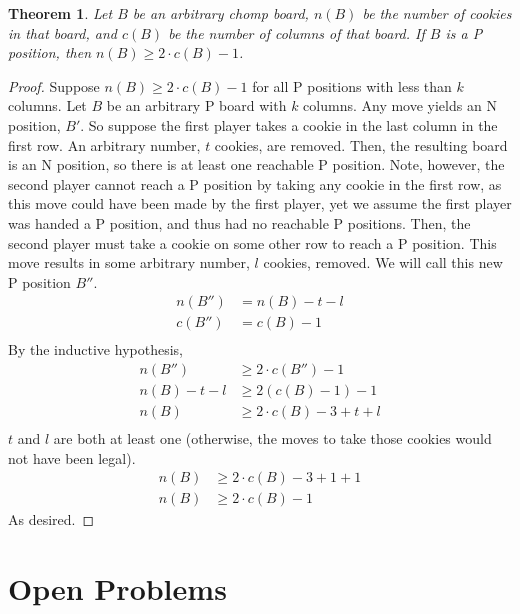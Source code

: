 \documentclass{amsart}
\newtheorem{thm}{Theorem}
\theoremstyle{definition}
\theoremstyle{remark}
\numberwithin{equation}{section}
\begin{document}
\begin{thm}
	Let $B$ be an arbitrary chomp board, $n(B)$ be the number of cookies in that board, and $c(B)$ be the number of columns of that board.  If $B$ is a P position, then $n(B) \geq 2\cdot c(B) - 1$.
\end{thm}

\begin{proof}
	Suppose $n(B) \geq 2\cdot c(B)-1$ for all P positions with less than $k$ columns.  Let $B$ be an arbitrary P board with $k$ columns.  Any move yields an N position, $B'$.  So suppose the first player takes a cookie in the last column in the first row.  An arbitrary number, $t$ cookies, are removed.  Then, the resulting board is an N position, so there is at least one reachable P position.  Note, however, the second player cannot reach a P position by taking any cookie in the first row, as this move could have been made by the first player, yet we assume the first player was handed a P position, and thus had no reachable P positions.  Then, the second player must take a cookie on some other row to reach a P position.  This move results in some arbitrary number, $l$ cookies, removed.  We will call this new P position $B''$.
	\begin{align*}
		n(B'') &= n(B) - t - l\\
		c(B'') &= c(B) - 1\\
	\end{align*}
	By the inductive hypothesis,
	\begin{align*}
		n(B'') &\geq 2\cdot c(B'')-1\\
		n(B) - t - l &\geq 2(c(B) - 1)-1\\
		n(B) &\geq 2\cdot c(B) - 3 + t + l\\
	\end{align*}
	$t$ and $l$ are both at least one (otherwise, the moves to take those cookies would not have been legal).
	\begin{align*}
		n(B) &\geq 2\cdot c(B) -3 + 1 + 1\\
		n(B) &\geq 2\cdot c(B) - 1
	\end{align*}
	As desired.
\end{proof}
\section{Open Problems}
\label{open_problems}

\end{document}
